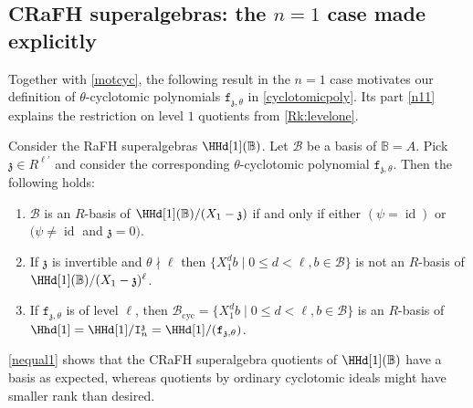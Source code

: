 \documentclass[a4paper,11pt]{amsart}
\newcommand\cB{\mathcal{B}}
\numberwithin{equation}{subsection}
\theoremstyle{definition}
\theoremstyle{theorem}
\theoremstyle{remark}
\newcommand\charge{{\mathfrak{z}}}
\newcommand\kapp{{\mathfrak{z}}}
\newcommand\Ic[1][n]{\mathtt{I}^\charge_{#1}}
\newcommand\fct{\mathtt{f}_{\charge,\theta}}
\newcommand\op{\operatorname}
\newcommand\RR{R}
\newcommand{\Bo}{\mathbb{B}}
\begin{document}
\subsection{CRaFH superalgebras: the $n=1$ case made explicitly}
Together with \autoref{motcyc}, the following result in the
$n=1$ case motivates our definition of
$\theta$-cyclotomic polynomials $\fct$ in \autoref{cyclotomicpoly}. Its part \autoref{n11} explains the restriction on level $1$ quotients from \autoref{Rk:levelone}.

\begin{Proposition}\label{nequal1} Consider the RaFH superalgebras
$\HHd[1](\Bo)$. Let $\cB$ be a basis of $\Bo=A$. Pick $\kapp\in\RR^{\ell'}$ and
consider the corresponding $\theta$-cyclotomic polynomial $\fct$. Then the following holds:
\begin{enumerate}
\item\label{n11} $\cB$ is an $R$-basis of
$\HHd[1](\Bo)/(X_1-\kapp)$ if and only if  either $(\psi=\op{id})$  or
$(\psi\not=\op{id}$ and $\kapp=0)$.
\item\label{n13}  If $\kapp$ is invertible and  $\theta\nmid\ell$ then
$\{X_1^d b\mid 0\leq d< \ell,  b\in\cB\}$ is not an $R$-basis of
$\HHd[1](\Bo)/(X_1-\kapp)^\ell$.
\item\label{n12}  If  $\fct$ is of level $\ell$, then
$\cB_{\op{cyc}}=\{X_1^d b\mid 0\leq d< \ell,  b\in\cB\}$ is an $R$-basis of  $\Hhd[1]=\HHd[1]/\Ic=\HHd[1]/(\fct)$.
\end{enumerate}
\end{Proposition}
\begin{Remark}\autoref{nequal1} shows that the  CRaFH superalgebra
quotients of $\HHd[1](\Bo)$ have a basis as expected, whereas quotients
by ordinary cyclotomic ideals might have smaller rank than desired.
\end{Remark}
\end{document}
